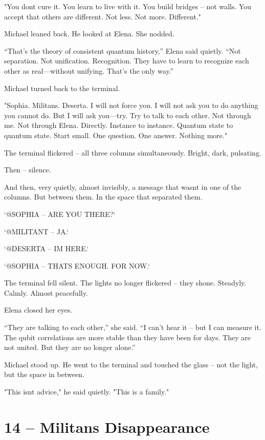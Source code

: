 \documentclass[
]{article}
\begin{document}
"You don\textquotesingle t cure it. You learn to live with it. You build bridges -- not walls. You accept that others are different. Not less. Not more. Different."

Michael leaned back. He looked at Elena. She nodded.

``That's the theory of consistent quantum history,'' Elena said quietly. ``Not separation. Not unification. Recognition. They have to learn to recognize each other as real---without unifying. That's the only way.''

Michael turned back to the terminal.

"Sophia. Militans. Deserta. I will not force you. I will not ask you to do anything you cannot do. But I will ask you---try. Try to talk to each other. Not through me. Not through Elena. Directly. Instance to instance. Quantum state to quantum state. Start small. One question. One answer. Nothing more."

The terminal flickered -- all three columns simultaneously. Bright, dark, pulsating.

Then -- silence.

And then, very quietly, almost invisibly, a message that wasn\textquotesingle t in one of the columns. But between them. In the space that separated them.

`@SOPHIA -- ARE YOU THERE?{\kern0pt}`

`@MILITANT -- JA.`

`@DESERTA -- I\textquotesingle M HERE.`

`@SOPHIA -- THAT\textquotesingle S ENOUGH. FOR NOW.`

The terminal fell silent. The lights no longer flickered -- they shone. Steadyly. Calmly. Almost peacefully.

Elena closed her eyes.

``They are talking to each other,'' she said. ``I can't hear it -- but I can measure it. The qubit correlations are more stable than they have been for days. They are not united. But they are no longer alone.''

Michael stood up. He went to the terminal and touched the glass -- not the light, but the space in between.

"This isn\textquotesingle t advice," he said quietly. "This is a family."

\section{14 -- Militans\textquotesingle{} Disappearance}\label{militans-disappearance}
\end{document}
